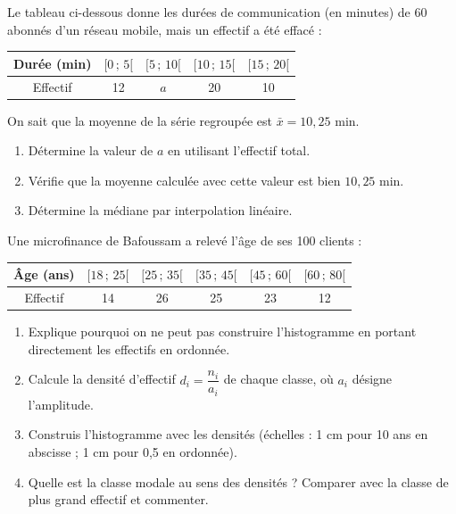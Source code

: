 \documentclass[11pt]{article}
\begin{document}
\begin{exercice}
Le tableau ci-dessous donne les durées de communication (en minutes) de 60 abonnés d'un réseau mobile, mais un effectif a été effacé :
\begin{center}
\begin{tabular}{|c|cccc|}\hline
Durée (min) & $[0\,;\,5[$ & $[5\,;\,10[$ & $[10\,;\,15[$ & $[15\,;\,20[$ \\ \hline
Effectif & 12 & $a$ & 20 & 10 \\ \hline
\end{tabular}
\end{center}
On sait que la moyenne de la série regroupée est $\bar{x} = 10{,}25$ min.
\begin{enumerate}
\item Détermine la valeur de $a$ en utilisant l'effectif total.
\item Vérifie que la moyenne calculée avec cette valeur est bien $10{,}25$ min.
\item Détermine la médiane par interpolation linéaire.
\end{enumerate}
\end{exercice}

\begin{exercice}
Une microfinance de Bafoussam a relevé l'âge de ses 100 clients :
\begin{center}
\begin{tabular}{|c|ccccc|}\hline
Âge (ans) & $[18\,;\,25[$ & $[25\,;\,35[$ & $[35\,;\,45[$ & $[45\,;\,60[$ & $[60\,;\,80[$ \\ \hline
Effectif & 14 & 26 & 25 & 23 & 12 \\ \hline
\end{tabular}
\end{center}
\begin{enumerate}
\item Explique pourquoi on ne peut pas construire l'histogramme en portant directement les effectifs en ordonnée.
\item Calcule la densité d'effectif $d_i = \dfrac{n_i}{a_i}$ de chaque classe, où $a_i$ désigne l'amplitude.
\item Construis l'histogramme avec les densités (échelles : 1 cm pour 10 ans en abscisse ; 1 cm pour 0,5 en ordonnée).
\item Quelle est la classe modale au sens des densités ? Comparer avec la classe de plus grand effectif et commenter.
\end{enumerate}
\end{exercice}
\end{document}
